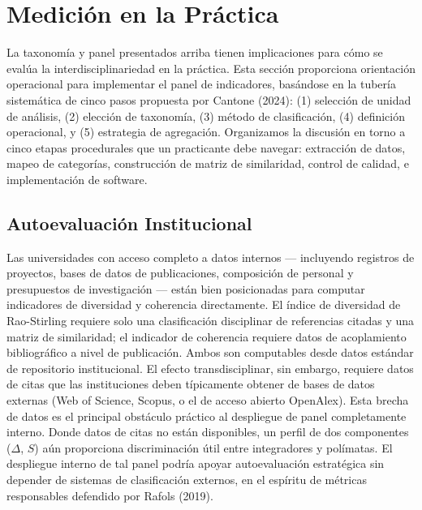 \documentclass[
]{article}
\begin{document}
\hypertarget{mediciuxf3n-en-la-pruxe1ctica}{%
\section{Medición en la Práctica}\label{mediciuxf3n-en-la-pruxe1ctica}}

La taxonomía y panel presentados arriba tienen implicaciones para cómo
se evalúa la interdisciplinariedad en la práctica. Esta sección
proporciona orientación operacional para implementar el panel de
indicadores, basándose en la tubería sistemática de cinco pasos
propuesta por Cantone (2024): (1) selección de unidad de análisis, (2)
elección de taxonomía, (3) método de clasificación, (4) definición
operacional, y (5) estrategia de agregación. Organizamos la discusión en
torno a cinco etapas procedurales que un practicante debe navegar:
extracción de datos, mapeo de categorías, construcción de matriz de
similaridad, control de calidad, e implementación de software.

\hypertarget{autoevaluaciuxf3n-institucional}{%
\subsection{Autoevaluación
Institucional}\label{autoevaluaciuxf3n-institucional}}

Las universidades con acceso completo a datos internos --- incluyendo
registros de proyectos, bases de datos de publicaciones, composición de
personal y presupuestos de investigación --- están bien posicionadas
para computar indicadores de diversidad y coherencia directamente. El
índice de diversidad de Rao-Stirling requiere solo una clasificación
disciplinar de referencias citadas y una matriz de similaridad; el
indicador de coherencia requiere datos de acoplamiento bibliográfico a
nivel de publicación. Ambos son computables desde datos estándar de
repositorio institucional. El efecto transdisciplinar, sin embargo,
requiere datos de citas que las instituciones deben típicamente obtener
de bases de datos externas (Web of Science, Scopus, o el de acceso
abierto OpenAlex). Esta brecha de datos es el principal obstáculo
práctico al despliegue de panel completamente interno. Donde datos de
citas no están disponibles, un perfil de dos componentes (\(\Delta\),
\(S\)) aún proporciona discriminación útil entre integradores y
polímatas. El despliegue interno de tal panel podría apoyar
autoevaluación estratégica sin depender de sistemas de clasificación
externos, en el espíritu de métricas responsables defendido por Rafols
(2019).
\end{document}
